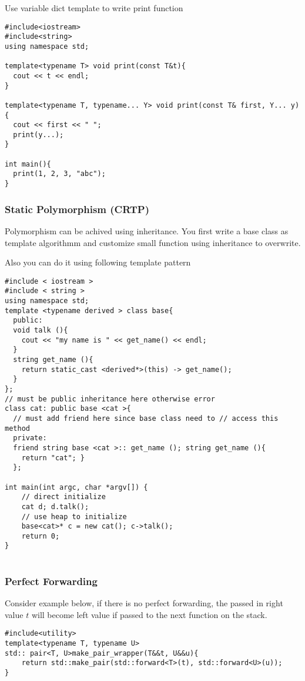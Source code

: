 Use variable dict template to write print function

\begin{lstlisting}
#include<iostream>
#include<string>
using namespace std;

template<typename T> void print(const T&t){
  cout << t << endl;
}

template<typename T, typename... Y> void print(const T& first, Y... y){
  cout << first << " ";
  print(y...);
}

int main(){
  print(1, 2, 3, "abc");
}
\end{lstlisting}

\subsubsection{Static Polymorphism (CRTP)}
Polymorphism can be achived using inheritance. You first write a base class as template algorithmm and customize small function using inheritance to overwrite.

Also you can do it using following template pattern
\begin{lstlisting}
#include < iostream >
#include < string >
using namespace std;
template <typename derived > class base{
  public:
  void talk (){
    cout << "my name is " << get_name() << endl;
  }
  string get_name (){
    return static_cast <derived*>(this) -> get_name();
  }
};
// must be public inheritance here otherwise error
class cat: public base <cat >{
  // must add friend here since base class need to // access this method
  private:
  friend string base <cat >:: get_name (); string get_name (){
    return "cat"; }
  };

int main(int argc, char *argv[]) {
    // direct initialize
    cat d; d.talk();
    // use heap to initialize
    base<cat>* c = new cat(); c->talk();
    return 0;
}


\end{lstlisting}

\subsubsection{Perfect Forwarding}

Consider example below, if there is no perfect forwarding, the passed in right value $t$ will become left value if passed to the next function on the stack.
\begin{lstlisting}
#include<utility>
template<typename T, typename U>
std:: pair<T, U>make_pair_wrapper(T&&t, U&&u){
	return std::make_pair(std::forward<T>(t), std::forward<U>(u));
}
\end{lstlisting}
